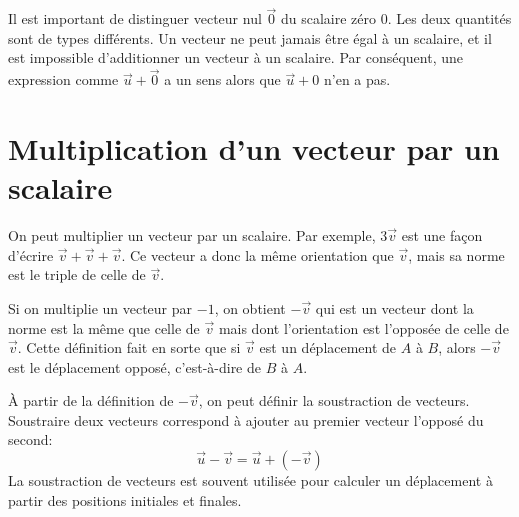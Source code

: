 \begin{marginfigure}
\end{marginfigure}

Il est important de distinguer vecteur nul $\vec{0}$ du scalaire zéro $0$.
Les deux quantités sont de types différents.  Un vecteur ne peut jamais être
égal à un scalaire, et il est impossible d'additionner un vecteur à un
scalaire.  Par conséquent, une expression comme $\vec{u} + \vec{0}$ a un sens
alors que $\vec{u} + 0$ n'en a pas.


\section{Multiplication d'un vecteur par un scalaire}

On peut multiplier un vecteur par un scalaire.  Par exemple, $3\vec{v}$ est une
façon d'écrire $\vec{v} + \vec{v} + \vec{v}$.  Ce vecteur a donc la même
orientation que $\vec{v}$, mais sa norme est le triple de celle de $\vec{v}$.

Si on multiplie un vecteur par $-1$, on obtient $-\vec{v}$ qui est un vecteur
dont la norme est la même que celle de $\vec{v}$ mais dont l'orientation est
l'opposée de celle de $\vec{v}$.  Cette définition fait en sorte que si
$\vec{v}$ est un déplacement de $A$ à $B$, alors $-\vec{v}$ est le déplacement
opposé, c'est-à-dire de $B$ à $A$.

À partir de la définition de $-\vec{v}$, on peut définir la soustraction de
vecteurs.  Soustraire deux vecteurs correspond à ajouter au premier vecteur
l'opposé du second:
\[
  \vec{u} - \vec{v} = \vec{u} + (-\vec{v})
\]
La soustraction de vecteurs est souvent utilisée pour calculer un déplacement à
partir des positions initiales et finales.

